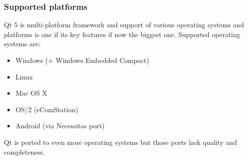 \subsubsection{Supported platforms}
Qt 5 is multi-platform framework and support of various operating systems and platforms is one if its key features if now the biggest one. Supported operating systems are:
\begin{itemize}
\item Windows ($+$ Windows Embedded Compact)
\item Linux
\item Mac OS X
\item OS/2 (eComStation)
\item Android (via Necessitas port)
\end{itemize}
Qt is ported to even more operating systems but those ports lack quality and completeness.

